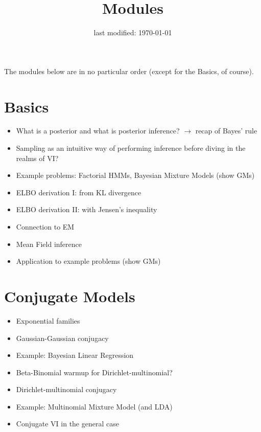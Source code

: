 \documentclass[11pt, a4paper]{article}
\title{Modules}
\date{last modified: \today}
\author{}
\newcommand{\wnote}[1]{\textcolor{red}{#1}}
\begin{document}
\maketitle


The modules below are in no particular order (except for the Basics, of course).

 
\section{Basics}

\begin{itemize}
\item What is a posterior and what is posterior inference? $ \rightarrow $ recap of Bayes' rule
\item Sampling as an intuitive way of performing inference before diving in the realms of VI?
\item Example problems: Factorial HMMs, Bayesian Mixture Models (show GMs)
\item ELBO derivation I: from KL divergence
\item ELBO derivation II: with Jensen's inequality
\item Connection to EM
\item Mean Field inference
\item Application to example problems (show GMs)
\end{itemize}

\section{Conjugate Models}

\begin{itemize}
\item Exponential families
\item Gaussian-Gaussian conjugacy
\item Example: Bayesian Linear Regression
\item Beta-Binomial warmup for Dirichlet-multinomial?
\item Dirichlet-multinomial conjugacy
\item Example: Multinomial Mixture Model (and LDA) 
\item Conjugate VI in the general case \citep{Beal:2003}
\end{itemize}
\end{document}
